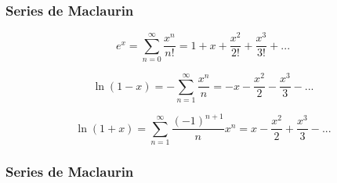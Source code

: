 \documentclass{beamer}
\begin{document}
\begin{frame}
\frametitle{Series de Maclaurin}

\[
 e^x = \sum_{n=0}^{\infty} \frac{x^n}{n!} = 1 + x + \frac{x^2}{2!} + \frac{x^3}{3!} + ...
\]

\[
\ln(1-x) = -\sum_{n=1}^{\infty} \frac{x^n}{n} = -x - \frac{x^2}{2} - \frac{x^3}{3} - ...
\]

\[
\ln (1+x) = \sum_{n=1}^{\infty} \frac{(-1)^{n+1}}{n} x^n = x - \frac{x^2}{2} + \frac{x^3}{3} - ...
\]

\end{frame}

\begin{frame}
\frametitle{Series de Maclaurin}


\end{frame}
\end{document}
